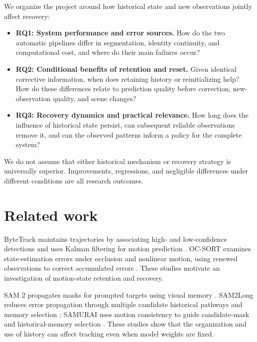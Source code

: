 \documentclass{article}
\begin{document}
We organize the project around how historical state and new observations jointly affect recovery:

\begin{itemize}

\item \textbf{RQ1: System performance and error sources.} How do the two automatic pipelines differ in segmentation, identity continuity, and computational cost, and where do their main failures occur?

\item \textbf{RQ2: Conditional benefits of retention and reset.} Given identical corrective information, when does retaining history or reinitializing help? How do these differences relate to prediction quality before correction, new-observation quality, and scene changes?

\item \textbf{RQ3: Recovery dynamics and practical relevance.} How long does the influence of historical state persist, can subsequent reliable observations remove it, and can the observed patterns inform a policy for the complete system?

\end{itemize}

We do not assume that either historical mechanism or recovery strategy is universally superior. Improvements, regressions, and negligible differences under different conditions are all research outcomes.

\section{Related work}

ByteTrack maintains trajectories by associating high- and low-confidence detections and uses Kalman filtering for motion prediction \citep{zhang2021}. OC-SORT examines state-estimation errors under occlusion and nonlinear motion, using renewed observations to correct accumulated errors \citep{cao2023}. These studies motivate an investigation of motion-state retention and recovery.

SAM 2 propagates masks for prompted targets using visual memory \citep{ravi2024}. SAM2Long reduces error propagation through multiple candidate historical pathways and memory selection \citep{ding2025}; SAMURAI uses motion consistency to guide candidate-mask and historical-memory selection \citep{yang2024}. These studies show that the organization and use of history can affect tracking even when model weights are fixed.
\end{document}
